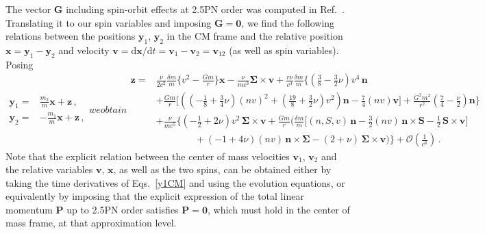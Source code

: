 \documentclass[
superscriptaddress,
preprint,
prd,tightenlines,showpacs,nofootinbib,
eqsecnum,
amsfonts,amsmath,amssymb]{revtex4-1}
\newcommand{\ud}{\mathrm{d}}
\begin{document}
The vector $\mathbf{G}$ including spin-orbit effects at 2.5PN order
was computed in Ref.~\cite{Faye2006}. Translating it to our spin
variables and imposing $\mathbf{G}=\mathbf{0}$, we find the following
relations between the positions $\mathbf{y}_1$, $\mathbf{y}_2$ in the
CM frame and the relative position
$\mathbf{x}=\mathbf{y}_1-\mathbf{y}_2$ and velocity
$\mathbf{v}=\ud\mathbf{x}/\ud
t=\mathbf{v}_1-\mathbf{v}_2=\mathbf{v}_{12}$ (as well as spin
variables). Posing
%
\begin{subequations}\label{y1CM}
\begin{align}
\mathbf{y}_1 =& \frac{m_2}{m}\mathbf{x} + \mathbf{z}\, , \\
\mathbf{y}_2 =& -\frac{m_1}{m}\mathbf{x} + \mathbf{z} \, ,
\end{align}
%
we obtain
%
\begin{align}
  \mathbf{z}=&\frac{\nu}{2 c^2} \frac{\delta
    m}{m}\Bigg\{v^{2}-\frac{Gm}{r}\Bigg\}\mathbf{x} -\frac{\nu}{m c^3}
  \mathbf{ \Sigma \times v } +\frac{r \nu}{c^4}\frac{\delta
    m}{m}\Bigg\{
  \left(\frac{3}{8}-\frac{3}{2}\nu\right)v^{4}\, \mathbf{n}\nonumber\\
  &+ \frac{G m}{r}\bigg[
  \left(\left(-\frac{1}{8}+\frac{3}{4}\nu\right)(nv)^2+
    \left(\frac{19}{8}+\frac{3}{2}\nu\right)v^{2}\right)\mathbf{n} -
  \frac{7}{4}(nv)\mathbf{v}\bigg] + \frac{G^2
    m^2}{r^2}\left(\frac{7}{4}-\frac{\nu}{2}\right)
  \mathbf{n}\Bigg\}\nonumber\\
  &+\frac{\nu}{m c^5}\Bigg\{ \left(-\frac{1}{2} + 2 \nu \right)v^{2}
  \, \mathbf{ \Sigma \times v } + \frac{G m}{r}\bigg( \frac{\delta
    m}{m} \Big[ (n,S,v) \, \mathbf{n} - \frac{3}{2} (nv)\, \mathbf{ n
    \times S } - \frac{1}{2}\, \mathbf{ S \times v }
  \Big]\nonumber\\
  &\qquad\qquad+\left(- 1+ 4 \nu \right)(nv) \, \mathbf{ n \times
    \Sigma } - \left(2+\nu\right) \, \mathbf{ \Sigma \times v }\bigg)
  \Bigg\} + \mathcal{O}\left(\frac{1}{c^6}\right) \, .
\end{align}
\end{subequations}
%
Note that the explicit relation between the center of mass velocities
$\mathbf{v}_1$, $\mathbf{v}_2$ and the relative variables
$\mathbf{v}$, $\mathbf{x}$, as well as the two spins, can be obtained
either by taking the time derivatives of Eqs.~\eqref{y1CM} and using
the evolution equations, or equivalently by imposing that the explicit
expression of the total linear momentum $\mathbf{P}$ up to 2.5PN order
satisfies $\mathbf{P}=\mathbf{0}$, which must hold in the center of
mass frame, at that approximation level.
\end{document}
